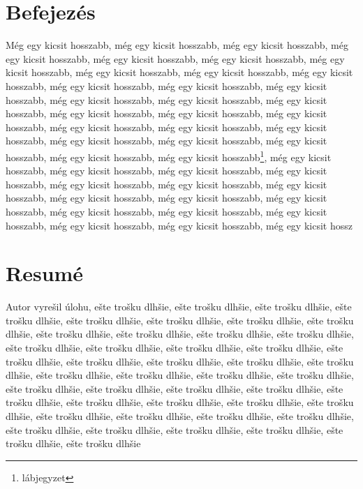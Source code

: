\documentclass[a4paper,oneside,onecolumn,12pt]{LegrandOrangeBook}
\begin{document}
\chapter*{Befejezés}

Még egy kicsit hosszabb, még egy kicsit hosszabb, még egy kicsit hosszabb, még egy kicsit hosszabb, még egy kicsit hosszabb, még egy kicsit hosszabb, még egy kicsit hosszabb, még egy kicsit hosszabb, még egy kicsit hosszabb, még egy kicsit hosszabb, még egy kicsit hosszabb, még egy kicsit hosszabb, még egy kicsit hosszabb, még egy kicsit hosszabb, még egy kicsit hosszabb, még egy kicsit hosszabb, még egy kicsit hosszabb, még egy kicsit hosszabb, még egy kicsit hosszabb, még egy kicsit hosszabb, még egy kicsit hosszabb, még egy kicsit hosszabb, még egy kicsit hosszabb, még egy kicsit hosszabb, még egy kicsit hosszabb, még egy kicsit hosszabb, még egy kicsit hosszabb\footnote{lábjegyzet}, még egy kicsit hosszabb, még egy kicsit hosszabb, még egy kicsit hosszabb, még egy kicsit hosszabb, még egy kicsit hosszabb, még egy kicsit hosszabb, még egy kicsit hosszabb, még egy kicsit hosszabb, még egy kicsit hosszabb, még egy kicsit hosszabb, még egy kicsit hosszabb, még egy kicsit hosszabb, még egy kicsit hosszabb, még egy kicsit hosszabb, még egy kicsit hosszabb, még egy kicsit hossz


\pagebreak
{} %
\chapter*{Resumé}

Autor vyrešil úlohu, ešte trošku dlhšie, ešte trošku dlhšie, ešte trošku dlhšie, ešte trošku dlhšie, ešte trošku dlhšie, ešte trošku dlhšie, ešte trošku dlhšie, ešte trošku dlhšie, ešte trošku dlhšie, ešte trošku dlhšie, ešte trošku dlhšie, ešte trošku dlhšie, ešte trošku dlhšie, ešte trošku dlhšie, ešte trošku dlhšie, ešte trošku dlhšie, ešte trošku dlhšie, ešte trošku dlhšie, ešte trošku dlhšie, ešte trošku dlhšie, ešte trošku dlhšie, ešte trošku dlhšie, ešte trošku dlhšie, ešte trošku dlhšie, ešte trošku dlhšie, ešte trošku dlhšie, ešte trošku dlhšie, ešte trošku dlhšie, ešte trošku dlhšie, ešte trošku dlhšie, ešte trošku dlhšie, ešte trošku dlhšie, ešte trošku dlhšie, ešte trošku dlhšie, ešte trošku dlhšie, ešte trošku dlhšie, ešte trošku dlhšie, ešte trošku dlhšie, ešte trošku dlhšie, ešte trošku dlhšie, ešte trošku dlhšie, ešte trošku dlhšie, ešte trošku dlhšie, ešte trošku dlhšie

% 

\printbibliography[title=Hivatkozások] %
\pagebreak
\thispagestyle{empty}
\mbox{}
\vfill
\begin{Center}
\mbox{\vskip1cm}\EANisbn
\end{Center}
\end{document}
